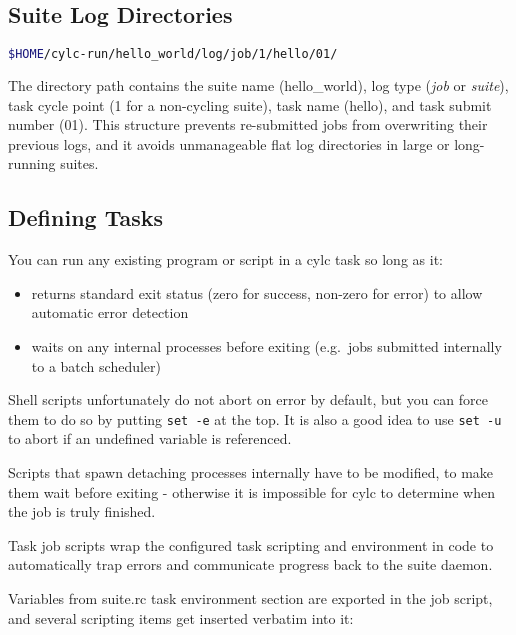 \subsection{Suite Log Directories}

\begin{lstlisting}[language=bash]
$HOME/cylc-run/hello_world/log/job/1/hello/01/
\end{lstlisting}

The directory path contains the suite name (hello\_world), log type ({\em job}
or {\em suite}), task cycle point (1 for a non-cycling suite), task name
(hello), and task submit number (01). This structure prevents re-submitted jobs
from overwriting their previous logs, and it avoids unmanageable flat log
directories in large or long-running suites.

\subsection{Defining Tasks}

You can run any existing program or script in a cylc task so long as it:
\begin{itemize}
    \item returns standard exit status (zero for success, non-zero
        for error) to allow automatic error detection
    \item waits on any internal processes before exiting (e.g.\ jobs
        submitted internally to a batch scheduler)
\end{itemize}

Shell scripts unfortunately do not abort on error by default, but you can force
them to do so by putting \lstinline=set -e= at the top.  It is also a good idea
to use \lstinline=set -u= to abort if an undefined variable is referenced. 

Scripts that spawn detaching processes internally have to be modified, to make
them wait before exiting - otherwise it is impossible for cylc to determine
when the job is truly finished.


Task job scripts wrap the configured task scripting and environment in
code to automatically trap errors and communicate progress back to the
suite daemon.

Variables from suite.rc task environment section are exported in the job
script, and several scripting items get inserted verbatim into it:


